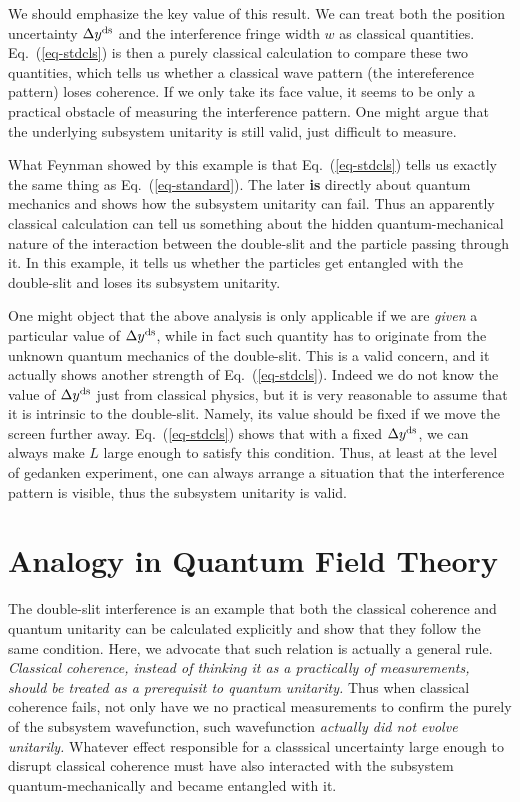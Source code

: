 \documentclass[aps,showpacs,twocolumn,floats,prd,superscriptaddress,nofootinbib]{revtex4-1}
\begin{document}
We should emphasize the key value of this result. We can treat both the position uncertainty $\Delta y^{\rm ds}$ and the interference fringe width $w$ as classical quantities. Eq.~(\ref{eq-stdcls}) is then a purely classical calculation to compare these two quantities, which tells us whether a classical wave pattern (the intereference pattern) loses coherence. If we only take its face value, it seems to be only a practical obstacle of measuring the interference pattern. One might argue that the underlying subsystem unitarity is still valid, just difficult to measure. 

What Feynman showed by this example is that Eq.~(\ref{eq-stdcls}) tells us exactly the same thing as Eq.~(\ref{eq-standard}). The later {\bf is} directly about quantum mechanics and shows how the subsystem unitarity can fail. Thus an apparently classical calculation can tell us something about the hidden quantum-mechanical nature of the interaction between the double-slit and the particle passing through it. In this example, it tells us whether the particles get entangled with the double-slit and loses its subsystem unitarity. 

One might object that the above analysis is only applicable if we are {\it given} a particular value of $\Delta y^{\rm ds}$, while in fact such quantity has to originate from the unknown quantum mechanics of the double-slit. This is a valid concern, and it actually shows another strength of Eq.~(\ref{eq-stdcls}). Indeed we do not know the value of $\Delta y^{\rm ds}$ just from classical physics, but it is very reasonable to assume that it is intrinsic to the double-slit. Namely, its value should be fixed if we move the screen further away. Eq.~(\ref{eq-stdcls}) shows that with a fixed $\Delta y^{\rm ds}$, we can always make $L$ large enough to satisfy this condition. Thus, at least at the level of gedanken experiment, one can always arrange a situation that the interference pattern is visible, thus the subsystem unitarity is valid.

\section{Analogy in Quantum Field Theory}
\label{sec-QFT}

The double-slit interference is an example that both the classical coherence and quantum unitarity can be calculated explicitly and show that they follow the same condition.
Here, we advocate that such relation is actually a general rule.
{\it Classical coherence, instead of thinking it as a practically of measurements, should be treated as a prerequisit to quantum unitarity.} 
Thus when classical coherence fails, not only have we no practical measurements to confirm the purely of the subsystem wavefunction, such wavefunction {\it actually did not evolve unitarily.}
Whatever effect responsible for a classsical uncertainty large enough to disrupt classical coherence must have also interacted with the subsystem quantum-mechanically and became entangled with it.
\end{document}
